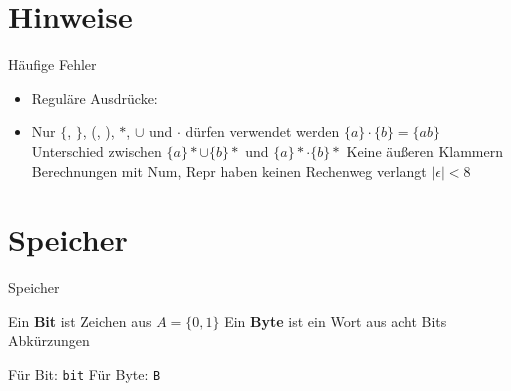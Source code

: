 \documentclass[handout]{beamer}
\begin{document}

\begin{frame}
	\titlepage
\end{frame}

\renewcommand{\ip}{} %

\renewenvironment{taskblock}[1]{\textbf{Aufgabe: #1}\\}{}
\renewcommand{\markBlue}[1]{\textbf{#1}}
\renewcommand{\markGreen}[1]{\textbf{#1}}

\section{Hinweise}

\begin{frame} {Häufige Fehler}
\begin{itemize}
	\item Reguläre Ausdrücke:
	\item Nur $\{$, $\}$, (, ), $*$, $\cup$ und $\cdot$ dürfen verwendet werden
	\pitem $\{a\} \cdot \{b\} = \{ab\}$
	\pitem Unterschied zwischen $\{a\}* \cup \{b\}*$ und $\{a\}* \cdot \{b\}*$
	\pitem Keine äußeren Klammern
	\pitem Berechnungen mit Num, Repr haben keinen Rechenweg verlangt
	\pitem $|\epsilon| < 8$
\end{itemize}
\end{frame}

\section{Speicher}

\begin{frame}{Speicher}
	\begin{itemize}
		\pitem Ein \textbf{Bit} ist Zeichen aus $A = \{0, 1\}$
		\pitem Ein \textbf{Byte} ist ein Wort aus acht Bits
		\pitem Abkürzungen
		\begin{itemize}
			\pitem Für Bit: \texttt{bit}
			\pitem Für Byte: \texttt{B}
		\end{itemize}
	\end{itemize}
\end{frame}
\end{document}
